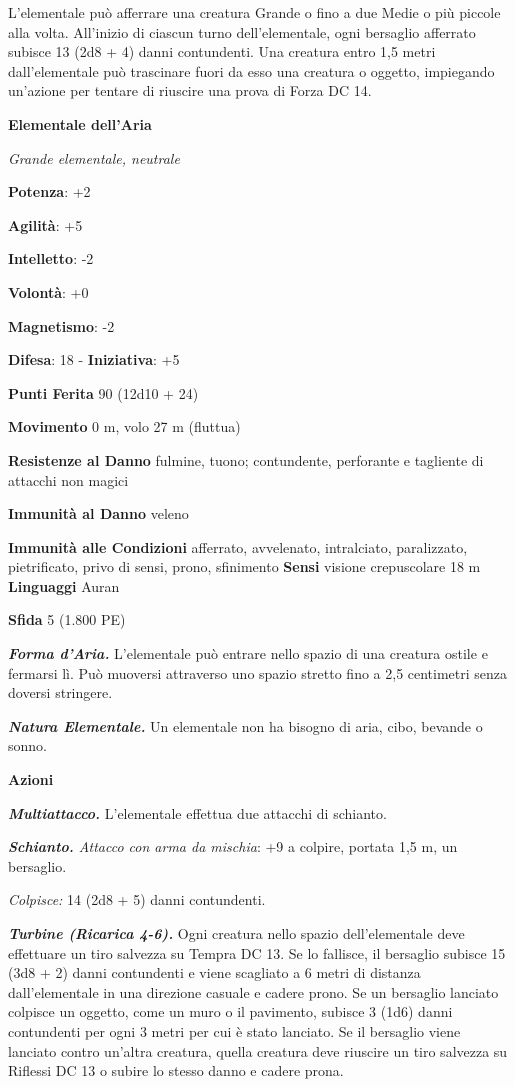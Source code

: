 \begin{multicols}{2}
L'elementale può afferrare una creatura Grande o fino a due Medie o più
piccole alla volta. All'inizio di ciascun turno dell'elementale, ogni
bersaglio afferrato subisce 13 (2d8 + 4) danni contundenti. Una creatura
entro 1,5 metri dall'elementale può trascinare fuori da esso una
creatura o oggetto, impiegando un'azione per tentare di riuscire una
prova di Forza DC 14.



\textbf{Elementale dell'Aria}

\emph{Grande elementale, neutrale}

\textbf{Potenza}: +2

\textbf{Agilità}: +5

\textbf{Intelletto}: -2

\textbf{Volontà}: +0

\textbf{Magnetismo}: -2

\textbf{Difesa}: 18 - \textbf{Iniziativa}: +5

\textbf{Punti Ferita} 90 (12d10 + 24)

\textbf{Movimento} 0 m, volo 27 m (fluttua)

\textbf{Resistenze al Danno} fulmine, tuono; contundente, perforante e
tagliente di attacchi non magici

\textbf{Immunità al Danno} veleno

\textbf{Immunità alle Condizioni} afferrato, avvelenato, intralciato,
paralizzato, pietrificato, privo di sensi, prono, sfinimento
\textbf{Sensi} visione crepuscolare 18 m
\textbf{Linguaggi} Auran

\textbf{Sfida} 5 (1.800 PE)

\emph{\textbf{Forma d'Aria.}} L'elementale può entrare nello spazio di
una creatura ostile e fermarsi lì. Può muoversi attraverso uno spazio
stretto fino a 2,5 centimetri senza doversi stringere.

\emph{\textbf{Natura Elementale.}} Un elementale non ha bisogno di aria,
cibo, bevande o sonno.

\textbf{Azioni}

\emph{\textbf{Multiattacco.}} L'elementale effettua due attacchi di
schianto.

\emph{\textbf{Schianto.} Attacco con arma da mischia}: +9 a colpire,
portata 1,5 m, un bersaglio.

\emph{Colpisce:} 14 (2d8 + 5) danni contundenti.

\emph{\textbf{Turbine (Ricarica 4-6).}} Ogni creatura nello spazio
dell'elementale deve effettuare un tiro salvezza su Tempra DC 13. Se lo
fallisce, il bersaglio subisce 15 (3d8 + 2) danni contundenti e viene
scagliato a 6 metri di distanza dall'elementale in una direzione casuale
e cadere prono. Se un bersaglio lanciato colpisce un oggetto, come un
muro o il pavimento, subisce 3 (1d6) danni contundenti per ogni 3 metri
per cui è stato lanciato. Se il bersaglio viene lanciato contro un'altra
creatura, quella creatura deve riuscire un tiro salvezza su Riflessi DC
13 o subire lo stesso danno e cadere prona.


\end{multicols}
